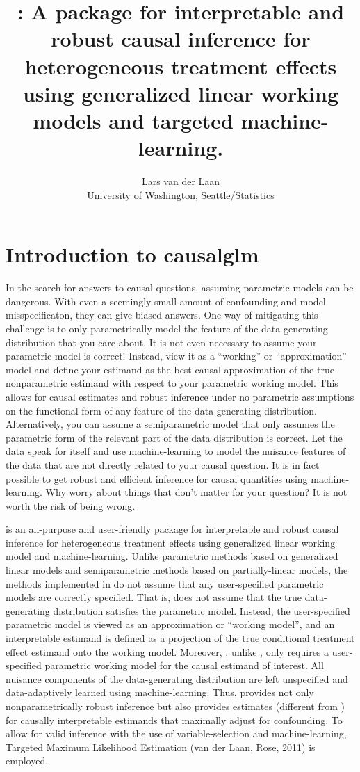 \documentclass[
]{jss}
\author{
Lars van der Laan\\University of Washington, Seattle/Statistics
}
\title{\pkg{causalglm}: A \pkg{tlverse} \proglang{R} package for interpretable
and robust causal inference for heterogeneous treatment effects using
generalized linear working models and targeted machine-learning.}
\begin{document}
\hypertarget{introduction-to-causalglm}{%
\section{Introduction to causalglm}\label{introduction-to-causalglm}}

In the search for answers to causal questions, assuming parametric
models can be dangerous. With even a seemingly small amount of
confounding and model misspecificaton, they can give biased answers. One
way of mitigating this challenge is to only parametrically model the
feature of the data-generating distribution that you care about. It is
not even necessary to assume your parametric model is correct! Instead,
view it as a ``working'' or ``approximation'' model and define your
estimand as the best causal approximation of the true nonparametric
estimand with respect to your parametric working model. This allows for
causal estimates and robust inference under no parametric assumptions on
the functional form of any feature of the data generating distribution.
Alternatively, you can assume a semiparametric model that only assumes
the parametric form of the relevant part of the data distribution is
correct. Let the data speak for itself and use machine-learning to model
the nuisance features of the data that are not directly related to your
causal question. It is in fact possible to get robust and efficient
inference for causal quantities using machine-learning. Why worry about
things that don't matter for your question? It is not worth the risk of
being wrong.

 is an all-purpose and user-friendly package for
interpretable and robust causal inference for heterogeneous treatment
effects using generalized linear working model and machine-learning.
Unlike parametric methods based on generalized linear models and
semiparametric methods based on partially-linear models, the methods
implemented in  do not assume that any user-specified
parametric models are correctly specified. That is,  does
not assume that the true data-generating distribution satisfies the
parametric model. Instead, the user-specified parametric model is viewed
as an approximation or ``working model'', and an interpretable estimand
is defined as a projection of the true conditional treatment effect
estimand onto the working model. Moreover, , unlike
, only requires a user-specified parametric working model for
the causal estimand of interest. All nuisance components of the
data-generating distribution are left unspecified and data-adaptively
learned using machine-learning. Thus,  provides not only
nonparametrically robust inference but also provides estimates
(different from ) for causally interpretable estimands that
maximally adjust for confounding. To allow for valid inference with the
use of variable-selection and machine-learning, Targeted Maximum
Likelihood Estimation (van der Laan, Rose, 2011) is employed.
\end{document}
